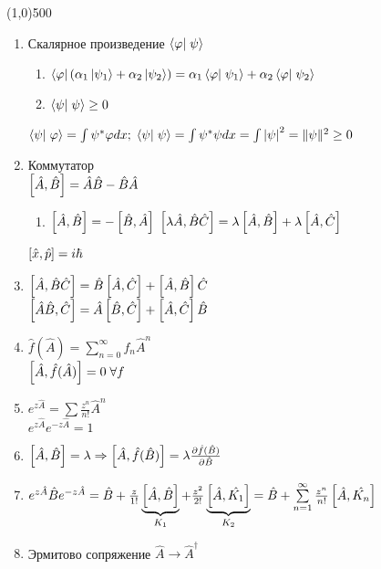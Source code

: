 


\fontsize{20}{24}
\line(1,0){500}
\fontsize{12}{15}
\begin{enumerate}[label=\textbf{\underline{\arabic*.}}]
\item Скалярное произведение $\braket{\varphi}{\psi}$
	\begin{enumerate}
            \item $\bra{\varphi}(\alpha_1\ket{\psi_1}+\alpha_2\ket{\psi_2})=\alpha_1\braket{\varphi}{\psi_1}+\alpha_2\braket{\varphi}{\psi_2}$
            \item $\braket{\psi}{\psi}\geq 0$
	\end{enumerate}
      $\braket{\psi}{\varphi}=\int\psi^*\varphi dx;\;\braket{\psi}{\psi}=\int\psi^*\psi dx =\int\abs{\psi}^2=\qnorm{\psi}\geq 0$
\item Коммутатор\\
      $\left[ \hat{A}, \hat{B} \right]=\hat{A}\hat{B}-\hat{B}\hat{A}$
      \begin{enumerate}[label=\textbf{\underline{\alph*.}}]
            \item $ \left[ \hat{A}, \hat{B} \right]=-\left[ \hat{B}, \hat{A} \right] $
            \inlineitem $ \left[ \lambda\hat{A},\hat{B}\hat{C} \right] = \lambda\left[ \hat{A}, \hat{B} \right] + \lambda\left[ \hat{A}, \hat{C} \right] $
      \end{enumerate}
      $\left[ \hat{x}, \hat{p} \right]=i\hbar$
\item $ \left[ \hat{A}, \hat{B}\hat{C} \right] = \hat{B}\left[ \hat{A}, \hat{C} \right] + \left[ \hat{A}, \hat{B} \right]\hat{C} $\\
      $ \left[ \hat{A}\hat{B}, \hat{C} \right] = \hat{A}\left[ \hat{B}, \hat{C} \right] + \left[ \hat{A}, \hat{C} \right]\hat{B} $
\item $ \hat{f}(\hat{A})=\sum\limits_{n=0}^{\infty}f_n \hat{A}^n $\\
      $\left[ \hat{A}, \hat{f}(\hat{A}) \right] = 0\;\forall f $
\item $ e^{z\hat{A}}=\sum \frac{z^n}{n!}\hat{A}^n $ \\
      $ e^{z\hat{A}}e^{-z\hat{A}} = 1 $
\item $ \left[ \hat{A}, \hat{B} \right]=\lambda \Rightarrow \left[ \hat{A}, \hat{f}(\hat{B}) \right]=\lambda \frac{\partial \hat{f}(\hat{B})}{\partial \hat{B}} $
\item $ e^{z\hat{A}}\hat{B}e^{-z\hat{A}} = \hat{B} + \frac{z}{1!}\underbrace{\left[ \hat{A}, \hat{B} \right]}_{K_1} + \frac{z^2}{2!}\underbrace{\left[ \hat{A}, \hat{K_1} \right]}_{K_2} = \hat{B}+\sum\limits_{n=1}^{\infty}\frac{z^n}{n!}\left[ \hat{A}, \hat{K_n} \right] $
\item Эрмитово сопряжение $\hat{A}\rightarrow\hat{A}^\dagger $\\

\end{enumerate}
